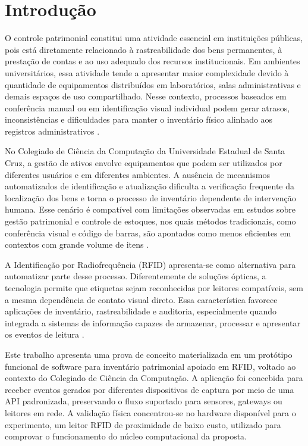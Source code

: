 \chapter{Introdução}

O controle patrimonial constitui uma atividade essencial em instituições públicas, pois está diretamente relacionado à rastreabilidade dos bens permanentes, à prestação de contas e ao uso adequado dos recursos institucionais. Em ambientes universitários, essa atividade tende a apresentar maior complexidade devido à quantidade de equipamentos distribuídos em laboratórios, salas administrativas e demais espaços de uso compartilhado. Nesse contexto, processos baseados em conferência manual ou em identificação visual individual podem gerar atrasos, inconsistências e dificuldades para manter o inventário físico alinhado aos registros administrativos \cite{tceba2018}.

No Colegiado de Ciência da Computação da Universidade Estadual de Santa Cruz, a gestão de ativos envolve equipamentos que podem ser utilizados por diferentes usuários e em diferentes ambientes. A ausência de mecanismos automatizados de identificação e atualização dificulta a verificação frequente da localização dos bens e torna o processo de inventário dependente de intervenção humana. Esse cenário é compatível com limitações observadas em estudos sobre gestão patrimonial e controle de estoques, nos quais métodos tradicionais, como conferência visual e código de barras, são apontados como menos eficientes em contextos com grande volume de itens \cite{brito2019}.

A Identificação por Radiofrequência (RFID) apresenta-se como alternativa para automatizar parte desse processo. Diferentemente de soluções ópticas, a tecnologia permite que etiquetas sejam reconhecidas por leitores compatíveis, sem a mesma dependência de contato visual direto. Essa característica favorece aplicações de inventário, rastreabilidade e auditoria, especialmente quando integrada a sistemas de informação capazes de armazenar, processar e apresentar os eventos de leitura \cite{alwadi2017,mashayekhy2022}.

Este trabalho apresenta uma prova de conceito materializada em um protótipo funcional de software para inventário patrimonial apoiado em RFID, voltado ao contexto do Colegiado de Ciência da Computação. A aplicação foi concebida para receber eventos gerados por diferentes dispositivos de captura por meio de uma API padronizada, preservando o fluxo suportado para sensores, gateways ou leitores em rede. A validação física concentrou-se no hardware disponível para o experimento, um leitor RFID de proximidade de baixo custo, utilizado para comprovar o funcionamento do núcleo computacional da proposta.

